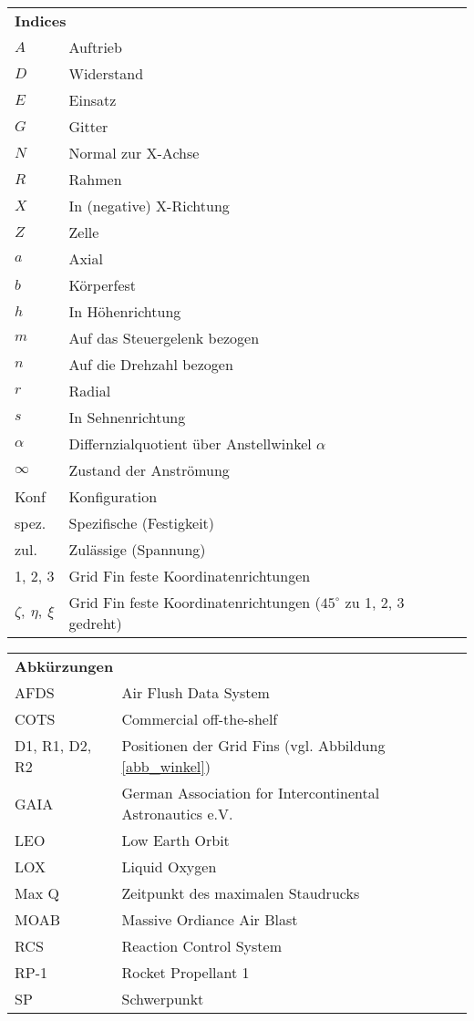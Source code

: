 \begin{longtable}[l]{ll}
	\multicolumn{2}{l}{\textbf{Indices}}\\
	$A$&Auftrieb\\
	$D$&Widerstand\\
	$E$&Einsatz\\
	$G$&Gitter\\
	$N$&Normal zur X-Achse\\
	$R$&Rahmen\\
	$X$&In (negative) X-Richtung\\
	$Z$&Zelle\\
	$a$&Axial\\
	$b$&Körperfest\\
	$h$&In Höhenrichtung\\
	$m$&Auf das Steuergelenk bezogen\\
	$n$&Auf die Drehzahl bezogen\\
	$r$&Radial\\
	$s$&In Sehnenrichtung\\
	$\alpha$&Differnzialquotient über Anstellwinkel $\alpha$\\
	$\infty$&Zustand der Anströmung\\
	Konf&Konfiguration\\
	spez.&Spezifische (Festigkeit)\\
	zul.&Zulässige (Spannung)\\
	1, 2, 3&Grid Fin feste Koordinatenrichtungen\\
	$\zeta ,\ \eta ,\ \xi$&Grid Fin feste Koordinatenrichtungen ($45^\circ$ zu 1, 2, 3 gedreht)\\
\end{longtable}

\begin{longtable}[l]{ll}
	\multicolumn{2}{l}{\textbf{Abkürzungen}}\\
	AFDS&Air Flush Data System\\
	COTS&Commercial off-the-shelf\\
	D1, R1, D2, R2&Positionen der Grid Fins (vgl. Abbildung \ref{abb_winkel})\\
	GAIA&German Association for Intercontinental Astronautics e.V.\\
	LEO&Low Earth Orbit\\
	LOX&Liquid Oxygen\\
	Max Q&Zeitpunkt des maximalen Staudrucks\\
	MOAB&Massive Ordiance Air Blast\\
	RCS&Reaction Control System\\
	RP-1&Rocket Propellant 1\\
	SP&Schwerpunkt\\
\end{longtable}